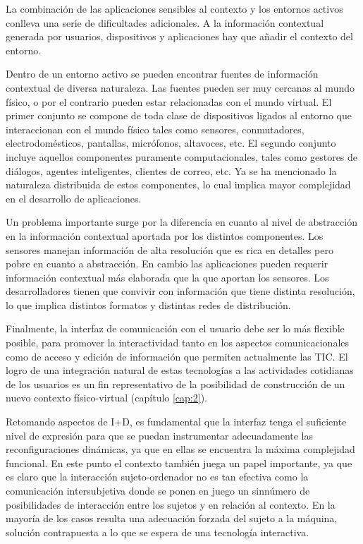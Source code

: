 {\begin{itemize}
\end{itemize}

La combinación de las aplicaciones sensibles al contexto y los entornos activos
conlleva una serie de dificultades adicionales. A la información contextual
generada por usuarios, dispositivos y aplicaciones hay que añadir el contexto
del entorno.

Dentro de un entorno activo se pueden encontrar fuentes de información
contextual de diversa naturaleza. Las fuentes pueden ser muy cercanas al mundo
físico, o por el contrario pueden estar relacionadas con el mundo virtual. El
primer conjunto se compone de toda clase de dispositivos ligados al entorno que
interaccionan con el mundo físico tales como sensores, conmutadores,
electrodomésticos, pantallas, micrófonos, altavoces, etc. El segundo conjunto
incluye aquellos componentes puramente computacionales, tales como gestores de
diálogos, agentes inteligentes, clientes de correo, etc. Ya se ha mencionado la
naturaleza distribuida de estos componentes, lo cual implica mayor complejidad
en el desarrollo de aplicaciones.

Un problema importante surge por la diferencia en cuanto al nivel de abstracción
en la información contextual aportada por los distintos componentes. Los
sensores manejan información de alta resolución que es rica en detalles pero
pobre en cuanto a abstracción. En cambio las aplicaciones pueden requerir
información contextual más elaborada que la que aportan los sensores. Los
desarrolladores tienen que convivir con información que tiene distinta
resolución, lo que implica distintos formatos y distintas redes de
distribución.

Finalmente, la interfaz de comunicación con el usuario debe ser lo más flexible posible, para
promover la interactividad tanto en los aspectos comunicacionales como de acceso y edición de información que permiten actualmente las TIC. El logro de una integración natural de estas tecnologías a las actividades cotidianas de los usuarios es un fin representativo de la posibilidad de construcción de un nuevo contexto físico-virtual (capítulo \ref{cap:2}).

Retomando aspectos de I+D, es fundamental que la interfaz tenga el suficiente nivel
de expresión para que se puedan instrumentar adecuadamente las reconfiguraciones
dinámicas, ya que en ellas se encuentra la máxima complejidad
funcional. En este punto el contexto también juega un papel importante, ya que es claro que la
interacción sujeto-ordenador no es tan efectiva como la comunicación intersubjetiva donde se ponen en juego un sinnúmero de posibilidades de interacción entre los sujetos y en relación al contexto. 
En la mayoría de los casos resulta una adecuación forzada del sujeto a la máquina, solución contrapuesta a lo que se espera de una tecnología interactiva.

}
